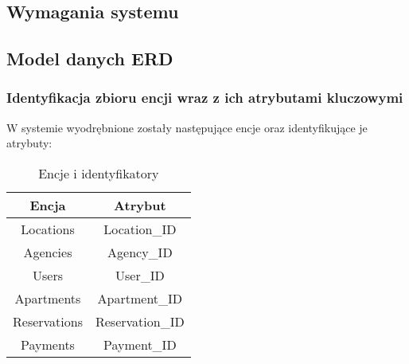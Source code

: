 \documentclass[polish, 11pt]{article}
\begin{document}
     

    \subsection{Wymagania systemu}
    
    \subsection{Model danych ERD}
        \subsubsection{Identyfikacja zbioru encji wraz z ich atrybutami kluczowymi}
            W systemie wyodrębnione zostały następujące encje oraz identyfikujące je atrybuty:
            \begin{table}[h]
                \centering
                \caption{Encje i identyfikatory}\label{tab:entitiesID}
                \begin{tabular}{cc}\toprule
                    Encja   	    &	Atrybut	\\\midrule
                    Locations	    &	Location\_ID	\\
                    Agencies	    &	Agency\_ID	\\
                    Users   	    &	User\_ID	\\
                    Apartments	    &	Apartment\_ID	\\
                    Reservations	&	Reservation\_ID	\\
                    Payments	    &	Payment\_ID	\\
                \bottomrule
                \end{tabular}
            \end{table}
\end{document}
